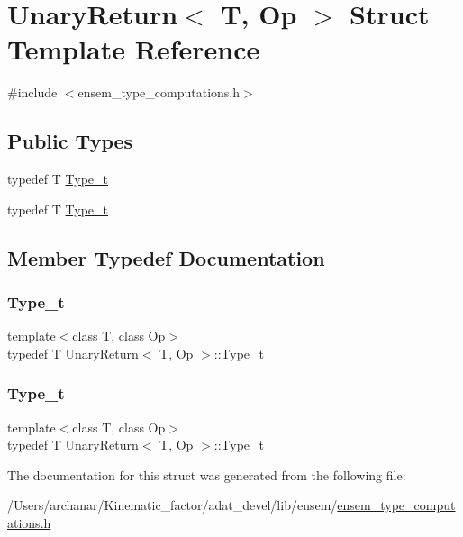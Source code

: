 \hypertarget{structUnaryReturn}{}\section{Unary\+Return$<$ T, Op $>$ Struct Template Reference}
\label{structUnaryReturn}


{\ttfamily \#include $<$ensem\+\_\+type\+\_\+computations.\+h$>$}

\subsection*{Public Types}
\begin{DoxyCompactItemize}
\item 
typedef T \mbox{\hyperlink{structUnaryReturn_afbc19933d7ee2962cbb363213d46dee0}{Type\+\_\+t}}
\item 
typedef T \mbox{\hyperlink{structUnaryReturn_afbc19933d7ee2962cbb363213d46dee0}{Type\+\_\+t}}
\end{DoxyCompactItemize}


\subsection{Member Typedef Documentation}
\mbox{\label{structUnaryReturn_afbc19933d7ee2962cbb363213d46dee0}} 
\subsubsection{\texorpdfstring{Type\_t}{Type\_t}\hspace{0.1cm}{\footnotesize\ttfamily [1/2]}}
{\footnotesize\ttfamily template$<$class T, class Op$>$ \\
typedef T \mbox{\hyperlink{structUnaryReturn}{Unary\+Return}}$<$ T, Op $>$\+::\mbox{\hyperlink{structUnaryReturn_afbc19933d7ee2962cbb363213d46dee0}{Type\+\_\+t}}}

\mbox{\label{structUnaryReturn_afbc19933d7ee2962cbb363213d46dee0}} 
\subsubsection{\texorpdfstring{Type\_t}{Type\_t}\hspace{0.1cm}{\footnotesize\ttfamily [2/2]}}
{\footnotesize\ttfamily template$<$class T, class Op$>$ \\
typedef T \mbox{\hyperlink{structUnaryReturn}{Unary\+Return}}$<$ T, Op $>$\+::\mbox{\hyperlink{structUnaryReturn_afbc19933d7ee2962cbb363213d46dee0}{Type\+\_\+t}}}



The documentation for this struct was generated from the following file\+:\begin{DoxyCompactItemize}
\item 
/\+Users/archanar/\+Kinematic\+\_\+factor/adat\+\_\+devel/lib/ensem/\mbox{\hyperlink{lib_2ensem_2ensem__type__computations_8h}{ensem\+\_\+type\+\_\+computations.\+h}}\end{DoxyCompactItemize}
